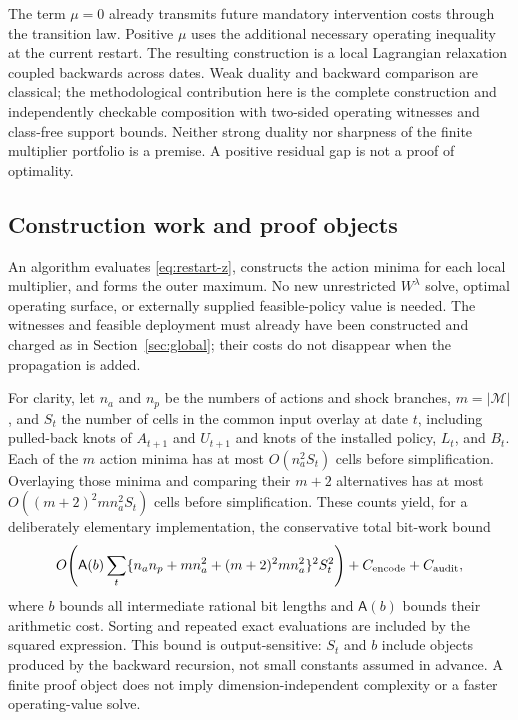 The term $\mu=0$ already transmits future mandatory intervention costs through the transition law. Positive $\mu$ uses the additional necessary operating inequality at the current restart. The resulting construction is a local Lagrangian relaxation coupled backwards across dates. Weak duality and backward comparison are classical; the methodological contribution here is the complete construction and independently checkable composition with two-sided operating witnesses and class-free support bounds. Neither strong duality nor sharpness of the finite multiplier portfolio is a premise. A positive residual gap is not a proof of optimality.

\subsection{Construction work and proof objects}\label{sec:restart-work}
An algorithm evaluates \eqref{eq:restart-z}, constructs the action minima for each local multiplier, and forms the outer maximum. No new unrestricted $W^\lambda$ solve, optimal operating surface, or externally supplied feasible-policy value is needed. The witnesses and feasible deployment must already have been constructed and charged as in Section~\ref{sec:global}; their costs do not disappear when the propagation is added.

For clarity, let $n_a$ and $n_p$ be the numbers of actions and shock branches, $m=|\mathcal M|$, and $S_t$ the number of cells in the common input overlay at date $t$, including pulled-back knots of $A_{t+1}$ and $U_{t+1}$ and knots of the installed policy, $L_t$, and $B_t$. Each of the $m$ action minima has at most $O(n_a^2S_t)$ cells before simplification. Overlaying those minima and comparing their $m+2$ alternatives has at most $O((m+2)^2m n_a^2S_t)$ cells before simplification. These counts yield, for a deliberately elementary implementation, the conservative total bit-work bound
\begin{equation}\label{eq:restart-work}
 O\!\left(\mathsf A(b)\sum_t
     \{n_an_p+m n_a^2+(m+2)^2m n_a^2\}^2 S_t^2\right)
       +C_{\rm encode}+C_{\rm audit},
\end{equation}
where $b$ bounds all intermediate rational bit lengths and $\mathsf A(b)$ bounds their arithmetic cost. Sorting and repeated exact evaluations are included by the squared expression. This bound is output-sensitive: $S_t$ and $b$ include objects produced by the backward recursion, not small constants assumed in advance. A finite proof object does not imply dimension-independent complexity or a faster operating-value solve.

